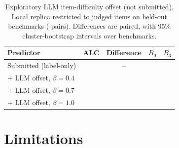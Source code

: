 \documentclass{article}
\begin{document}
\begin{table}[t]
  \caption{Exploratory LLM item-difficulty offset (not submitted). Local replica restricted to \LlmItems{} judged items on \LlmBench{} held-out benchmarks (\LlmPairs{} pairs). Differences are paired, with 95\% cluster-bootstrap intervals over benchmarks.}
  \label{tab:llm}
  \centering
  \small
  \begin{tabular}{lcccc}
    \toprule
    Predictor & ALC & Difference & $B_0$ & $B_3$ \\
    \midrule
    Submitted (label-only) & \LlmAlcBase{} & -- & \LlmBzeroBase{} & \LlmBthreeBase{} \\
    \quad + LLM offset, $\beta=0.4$ & \LlmAlcFour{} & \LlmDiffFour{} & \LlmBzeroFour{} & \LlmBthreeFour{} \\
    \quad + LLM offset, $\beta=0.7$ & \LlmAlcSeven{} & \LlmDiffSeven{} & \LlmBzeroSeven{} & \LlmBthreeSeven{} \\
    \quad + LLM offset, $\beta=1.0$ & \LlmAlcTen{} & \LlmDiffTen{} & \LlmBzeroTen{} & \LlmBthreeTen{} \\
    \bottomrule
  \end{tabular}
\end{table}

\section{Limitations}
\label{sec:limits}
\end{document}
